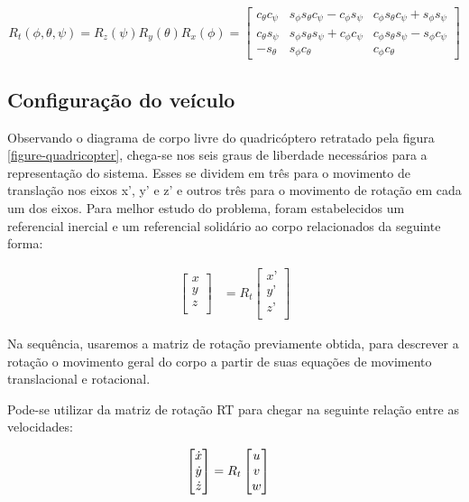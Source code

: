 \documentclass[
	12pt,				%
	openright,			%
	twoside,			%
	a4paper,			%
	english,			%
	brazil				%
	]{abntex2}
\begin{document}
\[
  R_{t}(\phi,\theta,\psi) = R_z(\psi) R_y(\theta) R_x(\phi) = 
  \begin{bmatrix}
    c_\theta c_\psi & s_\phi s_\theta c_\psi - c_\phi s_\psi & c_\phi s_\theta c_\psi + s_\phi s_\psi \\
    c_\theta s_\psi & s_\phi s_\theta s_\psi + c_\phi c_\psi & c_\phi s_\theta s_\psi - s_\phi c_\psi \\
    -s_\theta & s_\phi c_\theta & c_\phi c_\theta
  \end{bmatrix}
\]


\subsection{Configuração do veículo}


Observando o diagrama de corpo livre do quadricóptero retratado pela figura \ref*{figure-quadricopter},
chega-se nos seis graus de liberdade necessários para a representação do sistema. Esses se
dividem em três para o movimento de translação nos eixos x’, y’ e z’ e outros três para
o movimento de rotação em cada um dos eixos. Para melhor estudo do problema, foram
estabelecidos um referencial inercial e um referencial solidário ao corpo relacionados da
seguinte forma:

\begin{align*}
	\begin{bmatrix}
		x \\
		y \\
		z \\
	  \end{bmatrix}
	&= R_t
		\begin{bmatrix}
			x’ \\
			y’ \\
			z’ \\
		  \end{bmatrix}
  \end{align*}



Na sequência,  usaremos a matriz de rotação previamente obtida, para descrever a rotação o movimento geral do corpo a partir de suas equações de movimento translacional e rotacional.

Pode-se utilizar da matriz de rotação RT para chegar na seguinte relação entre as
velocidades:


\begin{align*}
	\begin{bmatrix}
		$$ \dot{x} $$ \\
		$$ \dot{y} $$ \\
		$$ \dot{z} $$ \\
	  \end{bmatrix}
	&= R_t
		\begin{bmatrix}
			u \\
			v \\
			w \\
		  \end{bmatrix}
  \end{align*}
\end{document}
